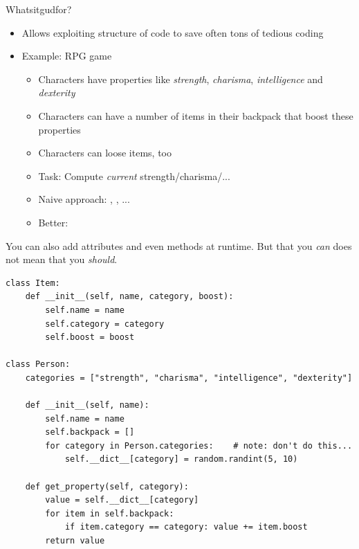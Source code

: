 
\begin{frame}{Whatsitgudfor?}
%
\begin{itemize}
\item Allows exploiting structure of code to save often tons of tedious coding
\item Example: RPG game
	\begin{itemize}
	\item Characters have properties like \emph{strength}, \emph{charisma}, \emph{intelligence} and \emph{dexterity}
	\item Characters can have a number of items in their backpack that boost these properties
	\item Characters can loose items, too
	\item[\Thus] Task: Compute \emph{current} strength/charisma/...
	\item[\Thus] Naive approach: , , ...
	\item[\Thus] Better: 
	\end{itemize}
\end{itemize}
%
\vspace{6pt}
\begin{warnbox}
You can also add attributes and even methods at runtime. But that you \emph{can} does not mean that you \emph{should}.
\end{warnbox}
%
\end{frame}


\begin{frame}[fragile]
%
\begin{codebox}
\begin{verbatim}
class Item:
    def __init__(self, name, category, boost):
        self.name = name
        self.category = category
        self.boost = boost

class Person:
    categories = ["strength", "charisma", "intelligence", "dexterity"]
    
    def __init__(self, name):
        self.name = name
        self.backpack = []        
        for category in Person.categories:    # note: don't do this...
            self.__dict__[category] = random.randint(5, 10)

    def get_property(self, category):
        value = self.__dict__[category]
        for item in self.backpack:
            if item.category == category: value += item.boost
        return value
\end{verbatim}
\end{codebox}
%
\end{frame}

